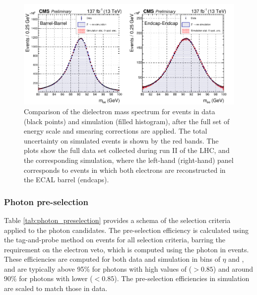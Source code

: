 \begin{figure}[hptb]
  \centering
  \includegraphics[width=1\textwidth]{Figures/hgg_overview/photon_energy_0.pdf}
  \caption[Dielectron mass spectrum for \Zee events in data and simulation after the energy corrections are applied]
  {
    Comparison of the dielectron mass spectrum for \Zee events in data (black points) and simulation (filled histogram), after the full set of energy scale and smearing corrections are applied. The total uncertainty on simulated events is shown by the red bands. The plots show the full data set collected during run II of the LHC, and the corresponding simulation, where the left-hand (right-hand) panel corresponds to events in which both electrons are reconstructed in the ECAL barrel (endcaps).
  }
  \label{fig:photon_energy_0}
\end{figure}

\subsubsection{Photon pre-selection}\label{sec:photon_preselection}
Table \ref{tab:photon_preselection} provides a schema of the selection criteria applied to the photon candidates. The pre-selection efficiency is calculated using the tag-and-probe method on \Zee events for all selection criteria, barring the requirement on the electron veto, which is computed using the photon in \Zmumug events. These efficiencies are computed for both data and simulation in bins of $\eta$ and \RNINE, and are typically above 95\% for photons with high values of \RNINE ($>0.85$) and around 90\% for photons with lower \RNINE ($<0.85$). The pre-selection efficiencies in simulation are scaled to match those in data.

